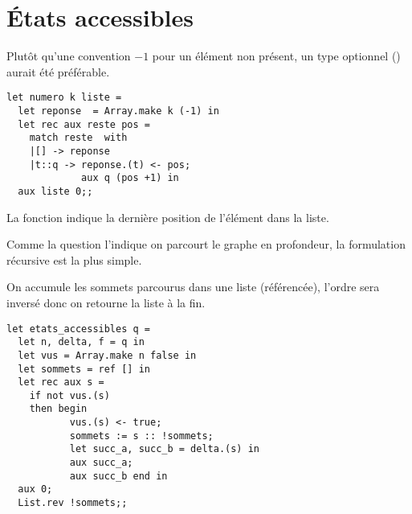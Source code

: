 \section{États accessibles}
\begin{Exercise}
Plutôt qu'une convention $-1$ pour un élément non présent, un type optionnel () aurait été préférable.

\begin{lstlisting}
let numero k liste = 
  let reponse  = Array.make k (-1) in
  let rec aux reste pos =
    match reste  with
    |[] -> reponse
    |t::q -> reponse.(t) <- pos; 
             aux q (pos +1) in
  aux liste 0;;
\end{lstlisting}
La fonction indique la dernière position de l'élément dans la liste.
\end{Exercise}
\begin{Exercise}
Comme la question l'indique on parcourt le graphe en profondeur, la formulation récursive est la plus simple.

On accumule les sommets parcourus dans une liste (référencée), l'ordre sera inversé donc on retourne la liste à la fin.
\begin{lstlisting}
let etats_accessibles q =
  let n, delta, f = q in
  let vus = Array.make n false in
  let sommets = ref [] in
  let rec aux s = 
    if not vus.(s)
    then begin
           vus.(s) <- true;
           sommets := s :: !sommets;
           let succ_a, succ_b = delta.(s) in
           aux succ_a;
           aux succ_b end in
  aux 0;
  List.rev !sommets;;   
\end{lstlisting}
\end{Exercise}
